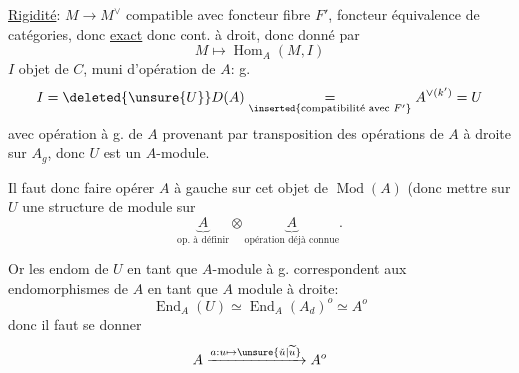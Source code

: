\uline{Rigidité}: $M\longrightarrow M^\vee$
compatible avec foncteur fibre $F'$,
foncteur équivalence de catégories, donc \uline{exact}
donc cont. à droit, 
donc donné par
\[
M\longmapsto\operatorname{Hom}_A(M,I)
\]
$I$ objet de $C$, muni d'opération de $A$: g.
\[
I=\deleted{\unsure{U}}D(A)
\underset{\inserted{\text{compatibilité avec }F'}}{=}
A^{\vee(k')}=U
\]
avec opération à g. de $A$ provenant par transposition
des opérations de $A$ à droite sur $A_g$, donc $U$ est un $A$-module.

Il faut donc faire opérer $A$ à gauche sur cet objet de
$\operatorname{Mod}(A)$ (donc mettre sur $U$ une structure de
 module sur
\[
\underbrace{A}_{\text{op. à définir}}\otimes
\underbrace{A}_{\text{opération déjà connue}}.
\]


Or les endom de $U$ en tant que $A$-module à g.
correspondent aux endomorphismes de $A$ en tant que $A$ module à droite:
\[
\operatorname{End}_A(U)\simeq
\operatorname{End}_A(A_d)^o\simeq A^o
\]
donc il faut se donner
\[
A\xrightarrow{a:u\mapsto\unsure{\check u|\widetilde u}}A^o
\]

